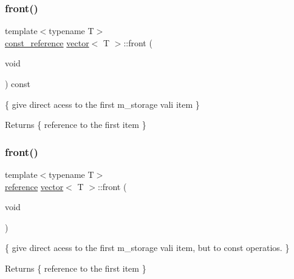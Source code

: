 \subsubsection{\texorpdfstring{front()}{front()}\hspace{0.1cm}{\footnotesize\ttfamily [1/2]}}
{\footnotesize\ttfamily template$<$typename T$>$ \\
\hyperlink{classvector_aad263433b4072dfbc26ace0df6441960}{const\+\_\+reference} \hyperlink{classvector}{vector}$<$ T $>$\+::front (\begin{DoxyParamCaption}\item[{void}]{ }\end{DoxyParamCaption}) const\hspace{0.3cm}{\ttfamily [inline]}}



\{ give direct acess to the first m\+\_\+storage vali item \} 

\begin{DoxyReturn}{Returns}
\{ reference to the first item \} 
\end{DoxyReturn}
\mbox{\label{classvector_a289b6dbbbd572cea8da012ed80ebff5d}} 
\subsubsection{\texorpdfstring{front()}{front()}\hspace{0.1cm}{\footnotesize\ttfamily [2/2]}}
{\footnotesize\ttfamily template$<$typename T$>$ \\
\hyperlink{classvector_a068ad546247a09ea9dd025658ad69348}{reference} \hyperlink{classvector}{vector}$<$ T $>$\+::front (\begin{DoxyParamCaption}\item[{void}]{ }\end{DoxyParamCaption})\hspace{0.3cm}{\ttfamily [inline]}}



\{ give direct acess to the first m\+\_\+storage vali item, but to const operatios. \} 

\begin{DoxyReturn}{Returns}
\{ reference to the first item \} 
\end{DoxyReturn}
\mbox{\label{classvector_a95e4321c6149aa10403ffac1211b6205}} 

